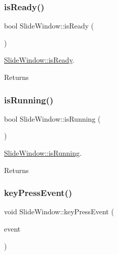 \subsubsection{\texorpdfstring{is\+Ready()}{isReady()}}
{\footnotesize\ttfamily bool Slide\+Window\+::is\+Ready (\begin{DoxyParamCaption}{ }\end{DoxyParamCaption})}



\mbox{\hyperlink{classSlideWindow_aeb8eb94e4d5e470ddd23129a337defed}{Slide\+Window\+::is\+Ready}}. 

\begin{DoxyReturn}{Returns}

\end{DoxyReturn}
\mbox{\label{classSlideWindow_aabcc67b2a5443bc5bfe27cbc348fc094}} 
\subsubsection{\texorpdfstring{is\+Running()}{isRunning()}}
{\footnotesize\ttfamily bool Slide\+Window\+::is\+Running (\begin{DoxyParamCaption}{ }\end{DoxyParamCaption})}



\mbox{\hyperlink{classSlideWindow_aabcc67b2a5443bc5bfe27cbc348fc094}{Slide\+Window\+::is\+Running}}. 

\begin{DoxyReturn}{Returns}

\end{DoxyReturn}
\mbox{\label{classSlideWindow_a0527c72528a39dfbe2a0efc611242464}} 
\subsubsection{\texorpdfstring{key\+Press\+Event()}{keyPressEvent()}}
{\footnotesize\ttfamily void Slide\+Window\+::key\+Press\+Event (\begin{DoxyParamCaption}\item[{Q\+Key\+Event $\ast$}]{event }\end{DoxyParamCaption})}



